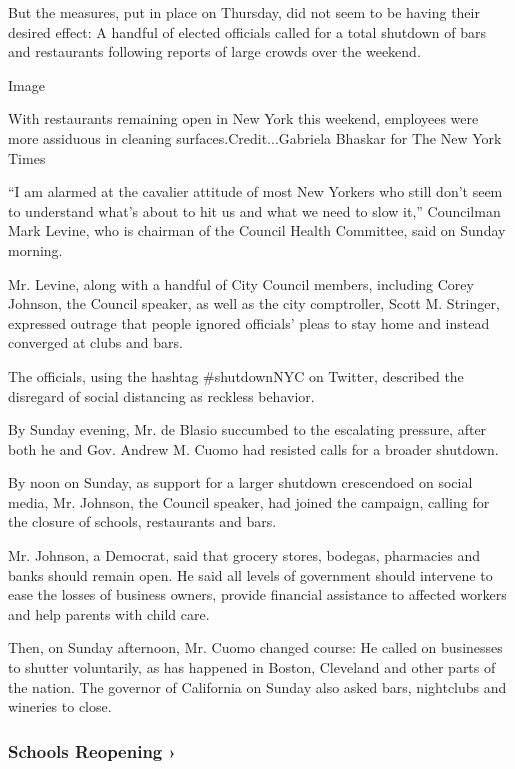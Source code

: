 But the measures, put in place on Thursday, did not seem to be having
their desired effect: A handful of elected officials called for a total
shutdown of bars and restaurants following reports of large crowds over
the weekend.

Image

With restaurants remaining open in New York this weekend, employees were
more assiduous in cleaning surfaces.Credit...Gabriela Bhaskar for The
New York Times

``I am alarmed at the cavalier attitude of most New Yorkers who still
don't seem to understand what's about to hit us and what we need to slow
it,'' Councilman Mark Levine, who is chairman of the Council Health
Committee, said on Sunday morning.

Mr. Levine, along with a handful of City Council members, including
Corey Johnson, the Council speaker, as well as the city comptroller,
Scott M. Stringer, expressed outrage that people ignored officials'
pleas to stay home and instead converged at clubs and bars.

The officials, using the hashtag \#shutdownNYC on Twitter, described the
disregard of social distancing as reckless behavior.

By Sunday evening, Mr. de Blasio succumbed to the escalating pressure,
after both he and Gov. Andrew M. Cuomo had resisted calls for a broader
shutdown.

By noon on Sunday, as support for a larger shutdown crescendoed on
social media, Mr. Johnson, the Council speaker, had joined the campaign,
calling for the closure of schools, restaurants and bars.

Mr. Johnson, a Democrat, said that grocery stores, bodegas, pharmacies
and banks should remain open. He said all levels of government should
intervene to ease the losses of business owners, provide financial
assistance to affected workers and help parents with child care.

Then, on Sunday afternoon, Mr. Cuomo changed course: He called on
businesses to shutter voluntarily, as has happened in Boston, Cleveland
and other parts of the nation. The governor of California on Sunday also
asked bars, nightclubs and wineries to close.

\href{https://www.nytimes.com/spotlight/schools-reopening?action=click\&pgtype=Article\&state=default\&region=MAIN_CONTENT_3\&context=storylines_keepup}{}

\hypertarget{schools-reopening-}{%
\subsubsection{Schools Reopening ›}\label{schools-reopening-}}

